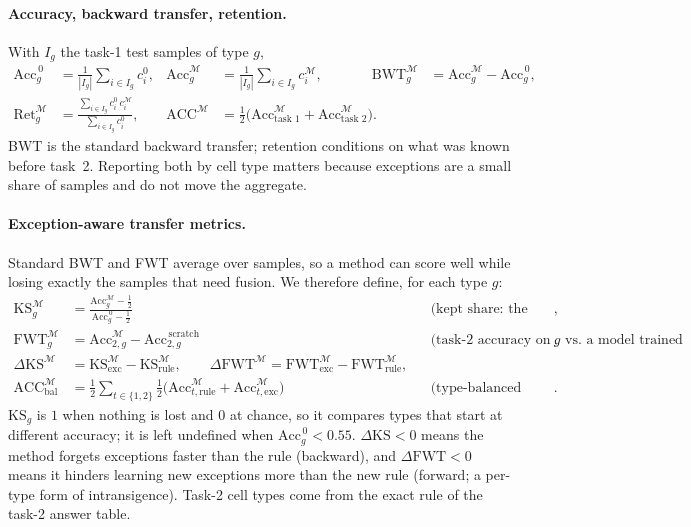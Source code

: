 \documentclass[11pt]{article}
\newcommand{\1}{\mathbf{1}}
\begin{document}
\paragraph{Accuracy, backward transfer, retention.} With $I_g$ the task-1 test samples of type $g$,
\begin{align}
  \mathrm{Acc}_g^{\,0}&=\tfrac{1}{|I_g|}\textstyle\sum_{i\in I_g} c_i^0, &
  \mathrm{Acc}_g^{\mathcal{M}}&=\tfrac{1}{|I_g|}\textstyle\sum_{i\in I_g} c_i^{\mathcal{M}}, &
  \mathrm{BWT}_g^{\mathcal{M}}&=\mathrm{Acc}_g^{\mathcal{M}}-\mathrm{Acc}_g^{\,0},\\
  \mathrm{Ret}_g^{\mathcal{M}}&=\frac{\sum_{i\in I_g} c_i^0\,c_i^{\mathcal{M}}}{\sum_{i\in I_g} c_i^0}, &
  \mathrm{ACC}^{\mathcal{M}}&=\tfrac12\big(\mathrm{Acc}^{\mathcal{M}}_{\text{task 1}}+\mathrm{Acc}^{\mathcal{M}}_{\text{task 2}}\big).
\end{align}
BWT is the standard backward transfer; retention conditions on what was known before task~2. Reporting both by cell
type matters because exceptions are a small share of samples and do not move the aggregate.

\paragraph{Exception-aware transfer metrics.} Standard BWT and FWT average over samples, so a method can score well
while losing exactly the samples that need fusion. We therefore define, for each type $g$:
\begin{align}
  \mathrm{KS}_g^{\mathcal{M}}&=\frac{\mathrm{Acc}_g^{\mathcal{M}}-\tfrac12}{\mathrm{Acc}_g^{\,0}-\tfrac12}
  &&\text{(kept share: the fraction of above-chance task-1 knowledge kept)},\\
  \mathrm{FWT}_g^{\mathcal{M}}&=\mathrm{Acc}_{2,g}^{\mathcal{M}}-\mathrm{Acc}_{2,g}^{\,\text{scratch}}
  &&\text{(task-2 accuracy on type $g$ vs.\ a model trained on task~2 alone, same budget)},\\
  \Delta\mathrm{KS}^{\mathcal{M}}&=\mathrm{KS}_{\text{exc}}^{\mathcal{M}}-\mathrm{KS}_{\text{rule}}^{\mathcal{M}},
  \qquad
  \Delta\mathrm{FWT}^{\mathcal{M}}=\mathrm{FWT}_{\text{exc}}^{\mathcal{M}}-\mathrm{FWT}_{\text{rule}}^{\mathcal{M}}, \\
  \mathrm{ACC}_{\text{bal}}^{\mathcal{M}}&=\tfrac12\textstyle\sum_{t\in\{1,2\}}\tfrac12\big(\mathrm{Acc}_{t,\text{rule}}^{\mathcal{M}}+\mathrm{Acc}_{t,\text{exc}}^{\mathcal{M}}\big)
  &&\text{(type-balanced accuracy)}.
\end{align}
$\mathrm{KS}_g$ is $1$ when nothing is lost and $0$ at chance, so it compares types that start at different accuracy;
it is left undefined when $\mathrm{Acc}_g^{\,0}<0.55$. $\Delta\mathrm{KS}<0$ means the method forgets exceptions faster
than the rule (backward), and $\Delta\mathrm{FWT}<0$ means it hinders learning new exceptions more than the new rule
(forward; a per-type form of intransigence). Task-2 cell types come from the exact rule of the task-2 answer table.
\end{document}
